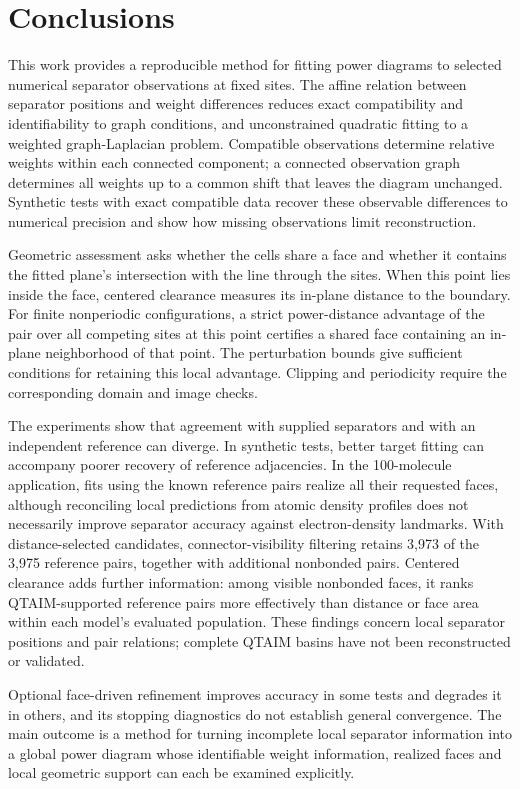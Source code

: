 \section{Conclusions}
\label{sec:conclusions}

This work provides a reproducible method for fitting power diagrams to selected numerical separator observations at fixed sites. The affine relation between separator positions and weight differences reduces exact compatibility and identifiability to graph conditions, and unconstrained quadratic fitting to a weighted graph-Laplacian problem. Compatible observations determine relative weights within each connected component; a connected observation graph determines all weights up to a common shift that leaves the diagram unchanged. Synthetic tests with exact compatible data recover these observable differences to numerical precision and show how missing observations limit reconstruction.

Geometric assessment asks whether the cells share a face and whether it contains the fitted plane's intersection with the line through the sites. When this point lies inside the face, centered clearance measures its in-plane distance to the boundary. For finite nonperiodic configurations, a strict power-distance advantage of the pair over all competing sites at this point certifies a shared face containing an in-plane neighborhood of that point. The perturbation bounds give sufficient conditions for retaining this local advantage. Clipping and periodicity require the corresponding domain and image checks.

The experiments show that agreement with supplied separators and with an independent reference can diverge. In synthetic tests, better target fitting can accompany poorer recovery of reference adjacencies. In the 100-molecule application, fits using the known reference pairs realize all their requested faces, although reconciling local predictions from atomic density profiles does not necessarily improve separator accuracy against electron-density landmarks. With distance-selected candidates, connector-visibility filtering retains 3,973 of the 3,975 reference pairs, together with additional nonbonded pairs. Centered clearance adds further information: among visible nonbonded faces, it ranks QTAIM-supported reference pairs more effectively than distance or face area within each model's evaluated population. These findings concern local separator positions and pair relations; complete QTAIM basins have not been reconstructed or validated.

\enlargethispage{\baselineskip}
Optional face-driven refinement improves accuracy in some tests and degrades it in others, and its stopping diagnostics do not establish general convergence. The main outcome is a method for turning incomplete local separator information into a global power diagram whose identifiable weight information, realized faces and local geometric support can each be examined explicitly.

